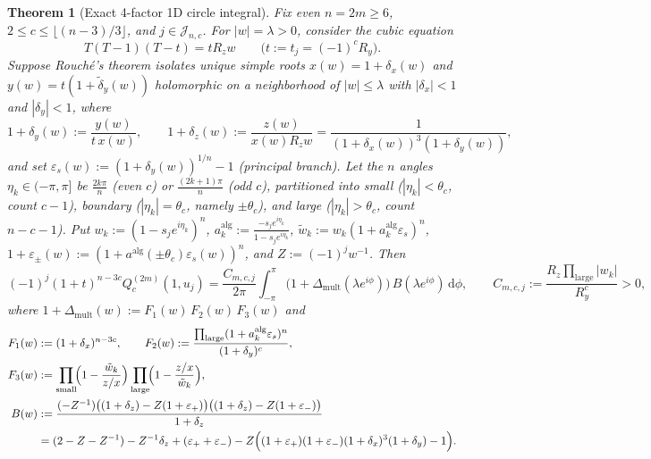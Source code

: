 \documentclass[10pt]{article}
\numberwithin{equation}{section}
\theoremstyle{plain}
\newtheorem{theorem}{Theorem}[section]
\theoremstyle{definition}
\newcommand{\dd}{\mathrm{d}}
\newcommand{\1}{\mathbf{1}}
\begin{document}
\begin{theorem}[Exact 4-factor 1D circle integral]\label{thm:circle-integral}
Fix even $n = 2m \ge 6$, $2 \le c \le \lfloor (n - 3)/3 \rfloor$, and $j \in \mathcal{J}_{n, c}$. For $|w| = \lambda > 0$, consider the cubic equation
\begin{equation}\label{eq:cubic}
T(T - 1)(T - t) = t R_z w \qquad \bigl(t := t_j = (-1)^c R_y\bigr).
\end{equation}
Suppose Rouch\'e's theorem isolates unique simple roots $x(w) = 1 + \delta_x(w)$ and $y(w) = t(1 + \tilde{\delta}_y(w))$ holomorphic on a neighborhood of $|w| \le \lambda$ with $|\delta_x| < 1$ and $|\delta_y| < 1$, where
\begin{equation}\label{eq:deltas}
1 + \delta_y(w) := \frac{y(w)}{t\, x(w)}, \qquad
1 + \delta_z(w) := \frac{z(w)}{x(w) R_z w} = \frac{1}{(1 + \delta_x(w))^3(1 + \delta_y(w))},
\end{equation}
and set $\varepsilon_s(w) := (1 + \delta_y(w))^{1/n} - 1$ (principal branch). Let the $n$ angles $\eta_k \in (-\pi, \pi]$ be $\frac{2k\pi}{n}$ (even $c$) or $\frac{(2k+1)\pi}{n}$ (odd $c$), partitioned into \emph{small} ($|\eta_k| < \theta_c$, count $c - 1$), \emph{boundary} ($|\eta_k| = \theta_c$, namely $\pm\theta_c$), and \emph{large} ($|\eta_k| > \theta_c$, count $n - c - 1$). Put $w_k := (1 - s_j e^{i\eta_k})^n$, $a_k^{\mathrm{alg}} := \frac{-s_j e^{i\eta_k}}{1 - s_j e^{i\eta_k}}$, $\tilde{w}_k := w_k (1 + a_k^{\mathrm{alg}}\varepsilon_s)^n$, $1 + \varepsilon_\pm(w) := (1 + a^{\mathrm{alg}}(\pm\theta_c)\varepsilon_s(w))^n$, and $Z := (-1)^j w^{-1}$. Then
\begin{equation}\label{eq:circle-integral}
(-1)^j (1 + t)^{n - 3c} Q_c^{(2m)}(1, u_j)
= \frac{C_{m,c,j}}{2\pi}\int_{-\pi}^{\pi} \bigl(1 + \Delta_{\mathrm{mult}}(\lambda e^{i\phi})\bigr)\, B(\lambda e^{i\phi})\, \dd\phi,
\qquad C_{m,c,j} := \frac{R_z \prod_{\mathrm{large}} |w_k|}{R_y^c} > 0,
\end{equation}
where $1 + \Delta_{\mathrm{mult}}(w) := F_1(w)\, F_2(w)\, F_3(w)$ and
\begin{subequations}\label{eq:F123B}
\begin{align}
F_1(w) &:= (1 + \delta_x)^{n - 3c}, \qquad
F_2(w) := \frac{\prod_{\mathrm{large}}(1 + a_k^{\mathrm{alg}} \varepsilon_s)^n}{(1 + \delta_y)^c}, \label{eq:F123B-a} \\
F_3(w) &:= \prod_{\mathrm{small}}\!\Bigl(1 - \frac{\tilde{w}_k}{z/x}\Bigr)\prod_{\mathrm{large}}\!\Bigl(1 - \frac{z/x}{\tilde{w}_k}\Bigr), \label{eq:F123B-b} \\
B(w) &:= \frac{(-Z^{-1})\bigl((1 + \delta_z) - Z(1 + \varepsilon_+)\bigr)\bigl((1 + \delta_z) - Z(1 + \varepsilon_-)\bigr)}{1 + \delta_z} \nonumber \\
&= (2 - Z - Z^{-1}) - Z^{-1}\delta_z + (\varepsilon_+ + \varepsilon_-) - Z\Bigl((1 + \varepsilon_+)(1 + \varepsilon_-)(1 + \delta_x)^3(1 + \delta_y) - 1\Bigr). \label{eq:F123B-c}
\end{align}
\end{subequations}
\end{theorem}
\end{document}
